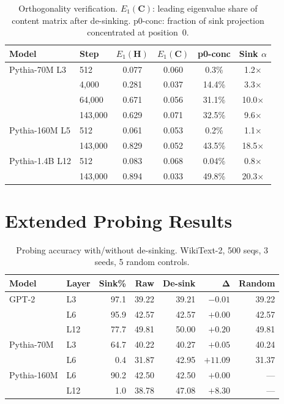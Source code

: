 \documentclass[11pt]{article}
\begin{document}
\begin{table}[h]
\centering
\caption{Orthogonality verification. $E_1(\mathbf{C})$: leading eigenvalue share of content matrix after de-sinking. p0-conc: fraction of sink projection concentrated at position~0.}
\label{tab:orthogonality}
\small
\begin{tabular}{@{}llcccc@{}}
\toprule
\textbf{Model} & \textbf{Step} & $E_1(\mathbf{H})$ & $E_1(\mathbf{C})$ & \textbf{p0-conc} & \textbf{Sink $\alpha$} \\
\midrule
Pythia-70M L3 & 512 & 0.077 & 0.060 & 0.3\% & 1.2$\times$ \\
 & 4{,}000 & 0.281 & 0.037 & 14.4\% & 3.3$\times$ \\
 & 64{,}000 & 0.671 & 0.056 & 31.1\% & 10.0$\times$ \\
 & 143{,}000 & 0.629 & 0.071 & 32.5\% & 9.6$\times$ \\
\midrule
Pythia-160M L5 & 512 & 0.061 & 0.053 & 0.2\% & 1.1$\times$ \\
 & 143{,}000 & 0.829 & 0.052 & 43.5\% & 18.5$\times$ \\
\midrule
Pythia-1.4B L12 & 512 & 0.083 & 0.068 & 0.04\% & 0.8$\times$ \\
 & 143{,}000 & 0.894 & 0.033 & 49.8\% & 20.3$\times$ \\
\bottomrule
\end{tabular}
\end{table}

\section{Extended Probing Results}\label{app:probing}

\begin{table}[h]
\centering
\caption{Probing accuracy with/without de-sinking. WikiText-2, 500 seqs, 3 seeds, 5 random controls.}
\small
\begin{tabular}{@{}llrrrrr@{}}
\toprule
\textbf{Model} & \textbf{Layer} & \textbf{Sink\%} & \textbf{Raw} & \textbf{De-sink} & $\boldsymbol{\Delta}$ & \textbf{Random} \\
\midrule
GPT-2 & L3 & 97.1 & 39.22 & 39.21 & $-0.01$ & 39.22 \\
 & L6 & 95.9 & 42.57 & 42.57 & $+0.00$ & 42.57 \\
 & L12 & 77.7 & 49.81 & 50.00 & $+0.20$ & 49.81 \\
\midrule
Pythia-70M & L3 & 64.7 & 40.22 & 40.27 & $+0.05$ & 40.24 \\
 & L6 & 0.4 & 31.87 & 42.95 & $\mathbf{+11.09}$ & 31.37 \\
\midrule
Pythia-160M & L6 & 90.2 & 42.50 & 42.50 & $+0.00$ & --- \\
 & L12 & 1.0 & 38.78 & 47.08 & $\mathbf{+8.30}$ & --- \\
\bottomrule
\end{tabular}
\end{table}
\end{document}
